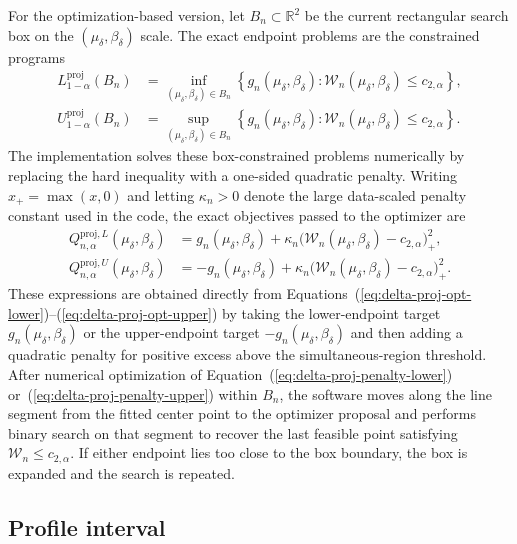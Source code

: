 \documentclass[11pt]{article}
\begin{document}
For the optimization-based version, let $B_n \subset \mathbb{R}^2$ be the current rectangular search box on the $(\mu_\delta,\beta_\delta)$ scale. The exact endpoint problems are the constrained programs
\begin{align}
  L^{\mathrm{proj}}_{1-\alpha}(B_n)
  &=
  \inf_{(\mu_\delta,\beta_\delta) \in B_n}
  \left\{
    g_n(\mu_\delta,\beta_\delta)
    :
    \mathcal{W}_n(\mu_\delta,\beta_\delta) \leq c_{2,\alpha}
  \right\},\label{eq:delta-proj-opt-lower}\\
  U^{\mathrm{proj}}_{1-\alpha}(B_n)
  &=
  \sup_{(\mu_\delta,\beta_\delta) \in B_n}
  \left\{
    g_n(\mu_\delta,\beta_\delta)
    :
    \mathcal{W}_n(\mu_\delta,\beta_\delta) \leq c_{2,\alpha}
  \right\}.\label{eq:delta-proj-opt-upper}
\end{align}
The implementation solves these box-constrained problems numerically by replacing the hard inequality with a one-sided quadratic penalty. Writing $x_+ = \max(x,0)$ and letting $\kappa_n > 0$ denote the large data-scaled penalty constant used in the code, the exact objectives passed to the optimizer are
\begin{align}
  Q^{\mathrm{proj},L}_{n,\alpha}(\mu_\delta,\beta_\delta)
  &=
  g_n(\mu_\delta,\beta_\delta)
  +
  \kappa_n\bigl(\mathcal{W}_n(\mu_\delta,\beta_\delta) - c_{2,\alpha}\bigr)_+^2,\label{eq:delta-proj-penalty-lower}\\
  Q^{\mathrm{proj},U}_{n,\alpha}(\mu_\delta,\beta_\delta)
  &=
  -g_n(\mu_\delta,\beta_\delta)
  +
  \kappa_n\bigl(\mathcal{W}_n(\mu_\delta,\beta_\delta) - c_{2,\alpha}\bigr)_+^2.\label{eq:delta-proj-penalty-upper}
\end{align}
These expressions are obtained directly from Equations~(\ref{eq:delta-proj-opt-lower})--(\ref{eq:delta-proj-opt-upper}) by taking the lower-endpoint target $g_n(\mu_\delta,\beta_\delta)$ or the upper-endpoint target $-g_n(\mu_\delta,\beta_\delta)$ and then adding a quadratic penalty for positive excess above the simultaneous-region threshold. After numerical optimization of Equation~(\ref{eq:delta-proj-penalty-lower}) or~(\ref{eq:delta-proj-penalty-upper}) within $B_n$, the software moves along the line segment from the fitted center point to the optimizer proposal and performs binary search on that segment to recover the last feasible point satisfying $\mathcal{W}_n \leq c_{2,\alpha}$. If either endpoint lies too close to the box boundary, the box is expanded and the search is repeated.

\subsection*{Profile interval}
\end{document}
